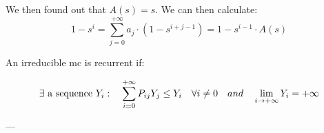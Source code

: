 We then found out that $A(s)=s$. We can then calculate:
\begin{equation}
	1-s^i = \sum\limits_{j=0}^{+\infty} a_{j} \cdot (1-s^{i+j-1}) = 1-s^{i-1} \cdot A(s)
\end{equation}


\begin{theorem}
	An irreducible \gls{mc} is recurrent if:

	\begin{equation}\noindent
		\exists \text{ a sequence } Y_i : \quad
		\sum\limits_{i=0}^{+\infty} P_{ij} Y_j \le Y_i \quad \forall i \neq 0 \quad and \quad
		\lim\limits_{i \to +\infty} Y_i = +\infty
		\end{equation}
\end{theorem}
---
